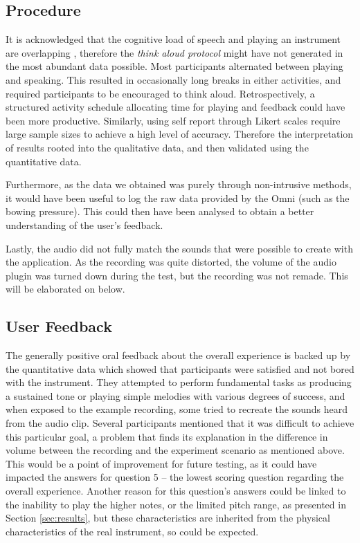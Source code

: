 \subsection{Procedure}
It is acknowledged that the cognitive load of speech and playing an instrument are overlapping \cite{Stowell2009}, therefore the \textit{think aloud protocol} might have not generated in the most abundant data possible. Most participants alternated between playing and speaking. This resulted in occasionally long breaks in either activities, and required participants to be encouraged to think aloud. Retrospectively, a structured activity schedule allocating time for playing and feedback could have been more productive. Similarly, using self report through Likert scales require large sample sizes to achieve a high level of accuracy\cite{Stowell2009}. Therefore the interpretation of results rooted into the qualitative data, and then validated using the quantitative data. 

Furthermore, as the data we obtained was purely through non-intrusive methods, it would have been useful to log the raw data provided by the Omni (such as the bowing pressure). This could then have been analysed to obtain a better understanding of the user's feedback.

Lastly, the audio did not fully match the sounds that were possible to create with the application. As the recording was quite distorted, the volume of the audio plugin was turned down during the test, but the recording was not remade. This will be elaborated on below.

\subsection{User Feedback}
The generally positive oral feedback about the overall experience is backed up by the quantitative data which showed that participants were satisfied and not bored with the instrument. They attempted to perform fundamental tasks as producing a sustained tone or playing simple melodies with various degrees of success, and when exposed to the example recording, some tried to recreate the sounds heard from the audio clip. Several participants mentioned that it was difficult to achieve this particular goal, a problem that finds its explanation in the difference in volume between the recording and the experiment scenario as mentioned above. This would be a point of improvement for future testing, as it could have impacted the answers for question 5 -- the lowest scoring question regarding the overall experience. Another reason for this question's answers could be linked to the inability to play the higher notes, or the limited pitch range, as presented in Section \ref{sec:results}, but these characteristics are inherited from the physical characteristics of the real instrument, so could be expected.

